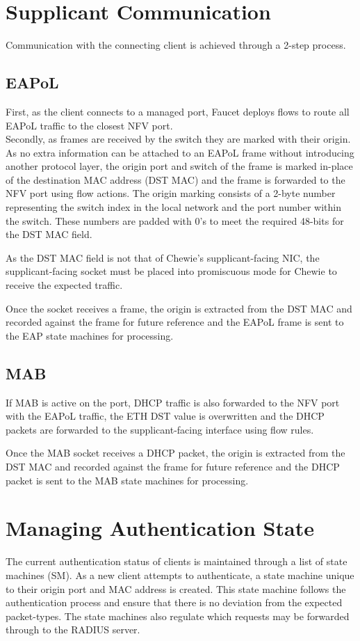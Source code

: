 \section{Supplicant Communication}
Communication with the connecting client is achieved through a 2-step process.
\subsection{EAPoL}
First, as the client connects to a managed port, Faucet deploys flows to route all EAPoL traffic to the closest NFV port.\\
Secondly, as frames are received by the switch they are marked with their origin. As no extra information can be attached to an EAPoL frame without introducing another protocol layer, the origin port and switch of the frame is marked in-place of the destination MAC address (DST MAC) and the frame is forwarded to the NFV port using flow actions.
The origin marking consists of a 2-byte number representing the switch index in the local network and the port number within the switch. These numbers are padded with 0's to meet the required 48-bits for the DST MAC field.

As the DST MAC field is not that of Chewie's supplicant-facing NIC, the supplicant-facing socket must be placed into promiscuous mode for Chewie to receive the expected traffic.

Once the socket receives a frame, the origin is extracted from the DST MAC and recorded against the frame for future reference and the EAPoL frame is sent to the EAP state machines for processing.

\subsection{MAB}
If MAB is active on the port, DHCP traffic is also forwarded to the NFV port with the EAPoL traffic, the ETH DST value is overwritten and the DHCP packets are forwarded to the supplicant-facing interface using flow rules.

Once the MAB socket receives a DHCP packet, the origin is extracted from the DST MAC and recorded against the frame for future reference and the DHCP packet is sent to the MAB state machines for processing.

\section{Managing Authentication State}
The current authentication status of clients is maintained through a list of state machines (SM). As a new client attempts to authenticate, a state machine unique to their origin port and MAC address is created. This state machine follows the authentication process and ensure that there is no deviation from the expected packet-types. The state machines also regulate which requests may be forwarded through to the RADIUS server.

